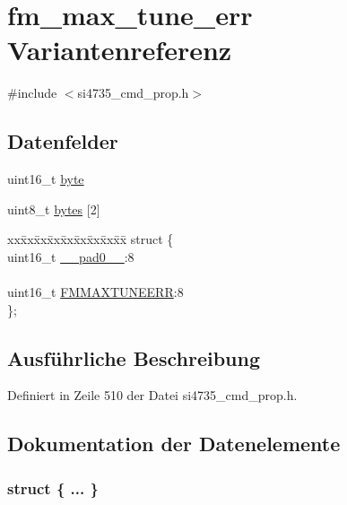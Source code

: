 \hypertarget{unionfm__max__tune__err}{}\section{fm\+\_\+max\+\_\+tune\+\_\+err Variantenreferenz}
\label{unionfm__max__tune__err}


{\ttfamily \#include $<$si4735\+\_\+cmd\+\_\+prop.\+h$>$}

\subsection*{Datenfelder}
\begin{DoxyCompactItemize}
\item 
uint16\+\_\+t \hyperlink{unionfm__max__tune__err_ab0549c1b5ea980a02e7eab77e21fea49}{byte}
\item 
uint8\+\_\+t \hyperlink{unionfm__max__tune__err_a46e4c05d20a047ec169f60d3167e912e}{bytes} \mbox{[}2\mbox{]}
\item 
\begin{tabbing}
xx\=xx\=xx\=xx\=xx\=xx\=xx\=xx\=xx\=\kill
struct \{\\
\>uint16\_t \hyperlink{unionfm__max__tune__err_a77132c2c26a75f5b8751b235cda23828}{\_\_pad0\_\_}:8\\
\>\\
\>uint16\_t \hyperlink{unionfm__max__tune__err_a89a109f2f7c80bdca8ffa991e3d8b2b7}{FMMAXTUNEERR}:8\\
\}; \\

\end{tabbing}\end{DoxyCompactItemize}


\subsection{Ausführliche Beschreibung}


Definiert in Zeile 510 der Datei si4735\+\_\+cmd\+\_\+prop.\+h.



\subsection{Dokumentation der Datenelemente}
\hypertarget{unionfm__max__tune__err_af1cc6a1c213bdf0c6d349b929d595e39}{}\subsubsection[{"@55}]{\setlength{\rightskip}{0pt plus 5cm}struct \{ ... \} }\label{unionfm__max__tune__err_af1cc6a1c213bdf0c6d349b929d595e39}
\hypertarget{unionfm__max__tune__err_a77132c2c26a75f5b8751b235cda23828}{}
